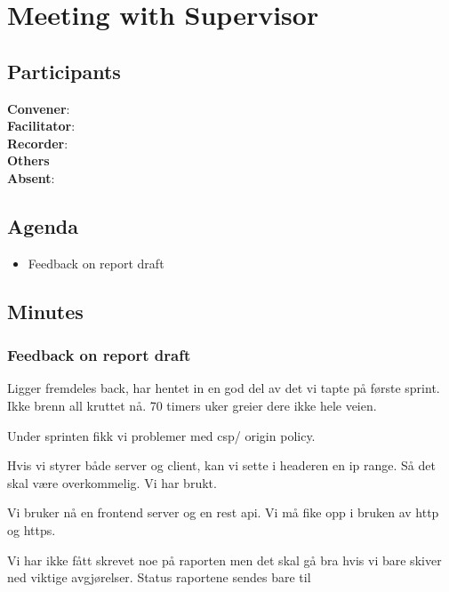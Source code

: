 \section*{Meeting with Supervisor}

\subsection*{Participants}

\textbf{Convener}: \supervisor{}\\
\textbf{Facilitator}: \facilitator{}  \\
\textbf{Recorder}: \scrummaster{}  \\
\textbf{Others}                            \\
\textbf{Absent}: \groupleader{}

\subsection*{Agenda}
\begin{itemize}
    \item Feedback on report draft

\end{itemize}

\subsection*{Minutes}

\subsubsection*{Feedback on report draft}
Ligger fremdeles back, har hentet in en god del av det vi tapte på første sprint. Ikke brenn all kruttet nå. 70 timers uker greier dere ikke hele veien. 

Under sprinten fikk vi problemer med csp/ origin policy. 

Hvis vi styrer både server og client, kan vi sette i headeren en ip range. Så det skal være overkommelig.
Vi har brukt.

Vi bruker nå en frontend server og en rest api. 
Vi må fike opp i bruken av http og https. 

Vi har ikke fått skrevet noe på raporten men det skal gå bra hvis vi bare skiver ned viktige avgjørelser.
Status raportene sendes bare til 

\newpage